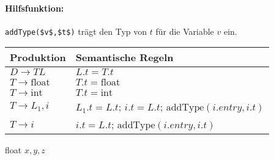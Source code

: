 \begin{itemize}
        \paragraph*{Hilfsfunktion:} \lstinline!addType($v$,$t$)! trägt den Typ von $t$ für die Variable $v$ ein.
        \begin{center}
            \begin{tabular}{|l|l|}
                Produktion & Semantische Regeln \\\hline
                $D \to TL$ & $L.t = T.t$\\\hline
                $T \to \text{float}$ & $T.t = \text{float}$ \\\hline
                $T \to \text{int}$ & $T.t = \text{int}$ \\\hline 
                $T \to L_1, i$ & $L_1.t = L.t$; $i.t = L.t$; $\text{addType}(i.entry, i.t)$ \\\hline 
                $T \to i$ & $i.t = L.t$; $\text{addType}(i.entry, i.t)$ \\\hline
            \end{tabular}
        \end{center}
        \Bsp float $x, y, z$
        \begin{center}
\end{center}
\end{itemize}
